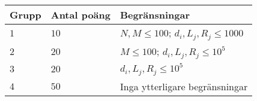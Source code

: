 \noindent
\begin{tabular}{| l | l | p{12cm} |}
  \hline
  \textbf{Grupp} & \textbf{Antal poäng} & \textbf{Begränsningar} \\ \hline
  $1$    & $10$       & $N, M \le 100$; $d_i, L_j, R_j \le 1000$ \\ \hline
  $2$    & $20$       & $M \le 100$; $d_i, L_j, R_j \le 10^5$ \\ \hline
  $3$    & $20$       & $d_i, L_j, R_j \le 10^5$ \\ \hline
  $4$    & $50$       & Inga ytterligare begränsningar \\ \hline
\end{tabular}
